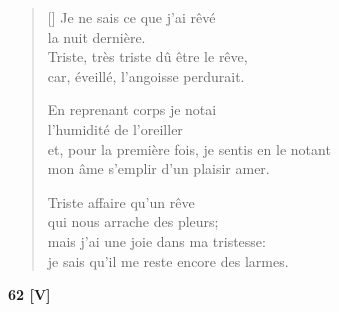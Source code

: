 \documentclass[a4paper,12pt]{book}
\begin{document}
\begin{verse}[\versewidth]
  Je ne sais ce que j'ai rêvé \\
  la nuit dernière. \\
  Triste, très triste dû être le rêve, \\
  car, éveillé, l'angoisse perdurait.

  En reprenant corps je notai \\
  l'humidité de l'oreiller \\
  et, pour la première fois, je sentis en le notant \\
  mon âme s'emplir d'un plaisir amer.

  Triste affaire qu'un rêve \\
  qui nous arrache des pleurs; \\
  mais j'ai une joie dans ma tristesse: \\
  je sais qu'il me reste encore des larmes.
\end{verse}

\bigskip

\begin{center}
  \textbf{62 [V]}
\end{center}

\settowidth{\versewidth}{que tapissent de blanches perles,}
\end{document}
